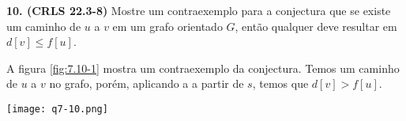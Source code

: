 
\noindent\textbf{10. (CRLS 22.3-8)} Mostre um contraexemplo para a conjectura que se existe um caminho de $u$
a $v$ em um grafo orientado $G$, então qualquer  deve resultar em $d[v] \leq f[u]$.

A figura \ref{fig:7.10-1} mostra um contraexemplo da conjectura. Temos um caminho de $u$ a $v$ no grafo, porém, aplicando a  a partir de $s$, temos que $d[v] > f[u]$.
\begin{center}
\texttt{[image: q7-10.png]}
\label{fig:7.10-1}
\end{center}